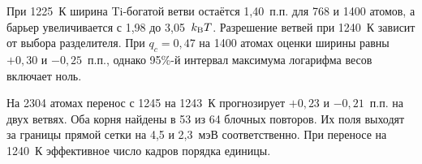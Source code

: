 При 1225~К ширина Ti-богатой ветви остаётся 1,40~п.п. для 768 и 1400 атомов, а барьер увеличивается с 1,98 до 3,05~\(k_{\rm B}T\). Разрешение ветвей при 1240~К зависит от выбора разделителя. При \(q_c=0{,}47\) на 1400 атомах оценки ширины равны \(+0{,}30\) и \(-0{,}25\)~п.п., однако 95\%-й интервал максимума логарифма весов включает ноль.

На 2304 атомах перенос с 1245 на 1243~К прогнозирует \(+0{,}23\) и \(-0{,}21\)~п.п. на двух ветвях. Оба корня найдены в 53 из 64 блочных повторов. Их поля выходят за границы прямой сетки на 4,5 и 2,3~мэВ соответственно. При переносе на 1240~К эффективное число кадров порядка единицы.
